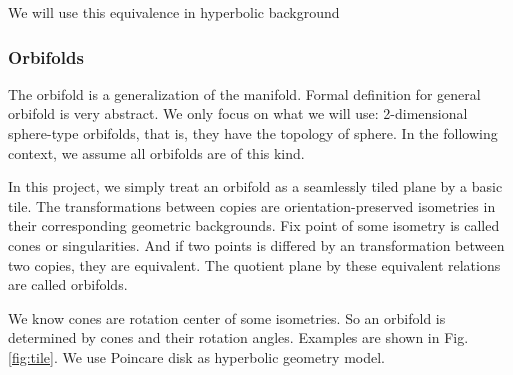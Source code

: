 We will use this equivalence in hyperbolic background

\subsubsection{Orbifolds}
The orbifold is a generalization of the manifold. Formal definition for general orbifold is very abstract. We only focus on what we will use: 2-dimensional sphere-type orbifolds, that is, they have the topology of sphere. In the following context, we assume all orbifolds are of this kind.

In this project, we simply treat an orbifold as a seamlessly tiled plane by a basic tile. The transformations between copies are orientation-preserved isometries in their corresponding geometric backgrounds. Fix point of some isometry is called cones or singularities. And if two points is differed by an transformation between two copies, they are equivalent. The quotient plane by these equivalent relations are called orbifolds.

We know cones are rotation center of some isometries. So an orbifold is determined by cones and their rotation angles. Examples are shown in Fig.\ref{fig:tile}. We use Poincare disk as hyperbolic geometry model.

